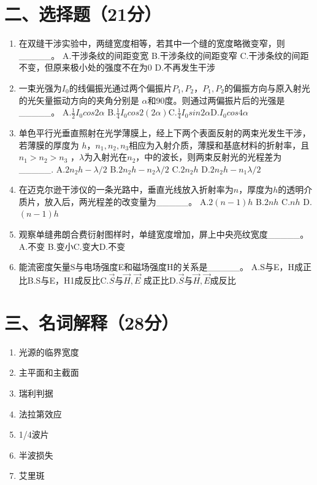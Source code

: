 \documentclass[12pt, a4paper]{article}
\theoremstyle{solution}
\begin{document}
\section*{二、选择题（21分）}
\begin{enumerate}
    \item 在双缝干涉实验中，两缝宽度相等，若其中一个缝的宽度略微变窄，则\_\_\_\_\_。
    A.干涉条纹的间距变宽 \quad B.干涉条纹的间距变窄 \quad C.干涉条纹的间距不变，但原来极小处的强度不在为0 \quad D.不再发生干涉
    \item 一束光强为$I_0$的线偏振光通过两个偏振片$P_1,P_2$，$P_1,P_2$的偏振方向与原入射光的光矢量振动方向的夹角分别是 $\alpha$和90度。则通过两偏振片后的光强是\_\_\_\_\_。
    A.$\frac{1}{2}I_0cos2\alpha$ \quad B.$\frac{1}{4}I_0cos2(2\alpha)$\quad C.$\frac{1}{4}I_0sin2\alpha$\quad D.$I_0cos4\alpha$
    \item 单色平行光垂直照射在光学薄膜上，经上下两个表面反射的两束光发生干涉，若薄膜的厚度为 $h$，$n_1,n_2,n_3$相应为入射介质，薄膜和基底材料的折射率，且 $n_1>n_2>n_3$  ，$\lambda$为入射光在$n_2$，中的波长，则两束反射光的光程差为\_\_\_\_\_.
    A.$2n_2h-\lambda/2$ \quad B.$2n_2h-n_2\lambda/2$ \quad C.$2n_2h$ \quad D.$2n_2h-n_1\lambda/2$ \quad
    \item 在迈克尔逊干涉仪的一条光路中，垂直光线放入折射率为$n$，厚度为$h$的透明介质片，放入后，两光程差的改变量为\_\_\_\_\_。
    A.$2(n-1)h$ \quad B.$2nh$ \quad C.$nh$ \quad D.$(n-1)h$
    \item 观察单缝弗朗合费衍射图样时，单缝宽度增加，屏上中央亮纹宽度\_\_\_\_\_。
    A.不变 \quad B.变小\quad C.变大\quad D.不变\quad
    \item 能流密度矢量S与电场强度E和磁场强度H的关系是\_\_\_\_\_。
    A.S与E，H成正比\quad B.S与E，H1成反比\quad C.$\overrightarrow{S}$与$\overrightarrow{ H},\overrightarrow{ E}$ 成正比\quad D.$\overrightarrow{S}$与$\overrightarrow{ H},\overrightarrow{ E}$成反比
\end{enumerate}
\section*{三、名词解释（28分）}
\begin{enumerate}
    \item 光源的临界宽度
    \item 主平面和主截面
    \item 瑞利判据
    \item 法拉第效应    
    \item 1/4波片
    \item 半波损失
    \item 艾里斑
\end{enumerate}
\end{document}
